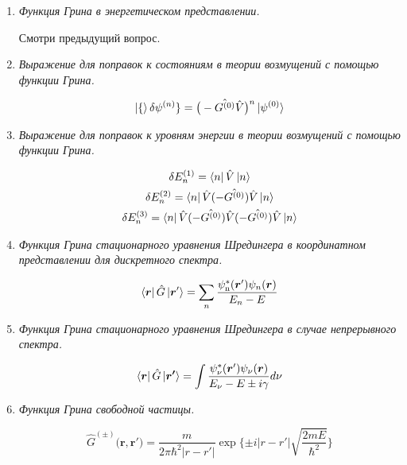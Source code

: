 \documentclass{article}
\begin{document}
\begin{enumerate}
		\item \textit{Функция Грина в энергетическом представлении.}
		
		Смотри предыдущий вопрос.
		
		\item \textit{Выражение для поправок к состояниям в теории возмущений с помощью функции Грина.}
		
		\begin{equation}
			\ket\{\delta\psi^{(n)}\}=\big(-\hat{G^{(0)}}\hat{V}\big)^{n}\ket{\psi^{(0)}}
		\end{equation}
		
		\item \textit{Выражение для поправок к уровням энергии в теории возмущений с помощью функции Грина.}
		
		\begin{gather}
			\delta E_{n}^{(1)}=\bra{n}\hat{V}\ket{n} \\
\delta E_{n}^{(2)}=\bra{n}\hat{V}(-\hat{G^{(0)}})\hat{V}\ket{n}
\\
\delta E_{n}^{(3)}=\bra{n}\hat{V}(-\hat{G^{(0)}})\hat{V}(-\hat{G^{(0)}})\hat{V}\ket{n}
		\end{gather}
		
		\item \textit{Функция Грина стационарного уравнения Шредингера в координатном представлении для дискретного спектра.}
		
		\begin{equation}
			\bra{\boldsymbol{r}}\hat{G}\ket{\boldsymbol{r}'}=\sum_{n}\frac{\psi_{\text{n}}^{*}(\boldsymbol{r}')\psi_{n}(\boldsymbol{r})}{E_{n}-E}
		\end{equation}
		
		\item \textit{Функция Грина стационарного уравнения Шредингера в случае непрерывного спектра.}		
		
		\begin{equation}
			\bra{\boldsymbol{r}}\hat{G}\ket{\boldsymbol{r'}}=\int\frac{\psi_{\nu}^{*}(\boldsymbol{r}')\psi_{\nu}(\boldsymbol{r})}{E_{\nu}-E\pm i\gamma}d\nu
		\end{equation}
		
		\item \textit{Функция Грина свободной частицы.}	
		
		\begin{equation}
			\hat{G}^{(\pm)}(\boldsymbol{r,r')}=\frac{m}{2\pi\hbar^{2}|r-r'|}\exp\{\pm i|r-r'|\sqrt{\frac{2mE}{\hbar^{2}}}\}
		\end{equation}
		

\end{enumerate}
\end{document}
